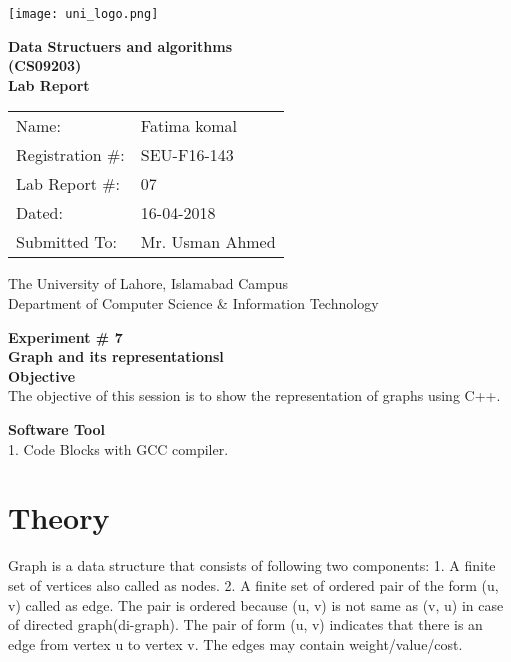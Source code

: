 \documentclass[11pt]{article}            %
\begin{document}
\begin{titlepage}
    \centering
  \vfill
    \texttt{[image: uni\_logo.png]} \\ 
	\vskip2cm
    {\bfseries\Large
	Data Structuers and algorithms \\ (CS09203)\\
	
	\vskip2cm
	Lab Report 
	 
	\vskip2cm
	}    

\begin{center}
\begin{tabular}{ l l  } 

Name: & Fatima komal \\ 
Registration \#: & SEU-F16-143 \\ 
Lab Report \#: & 07 \\ 
 Dated:& 16-04-2018\\ 
Submitted To:& Mr. Usman Ahmed\\ 

\end{tabular}
\end{center}
    \vfill
    The University of Lahore, Islamabad Campus\\
Department of Computer Science \& Information Technology
\end{titlepage}


    
    {\bfseries\Large
\centering
	Experiment \# 7 \\

Graph and its representationsl \\
	
	}    
 \vskip1cm
 \textbf {Objective}\\ The objective of this session is to show the representation of graphs using C++. 
 
 \textbf {Software Tool} \\
 1. Code Blocks with GCC compiler.

\section{Theory }              

Graph is a data structure that consists of following two components:
1. A finite set of vertices also called as nodes.
2. A finite set of ordered pair of the form (u, v) called as edge. The pair is ordered because (u, v) is not same as (v, u) in case of directed graph(di-graph). The pair of form (u, v) indicates that there is an edge from vertex u to vertex v. The edges may contain weight/value/cost.
\end{document}

